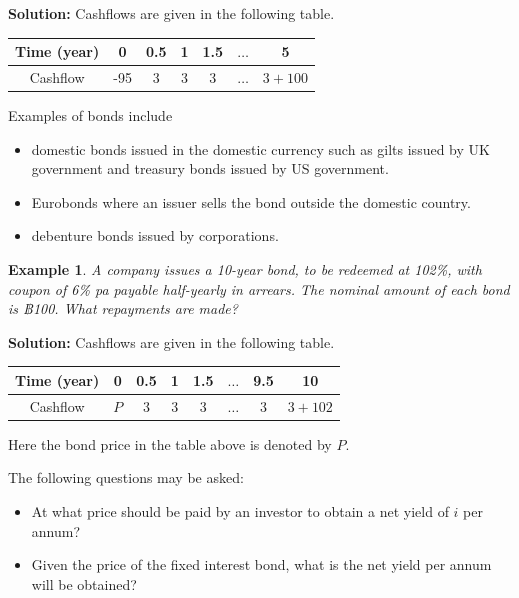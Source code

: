 \documentclass[
]{book}
\theoremstyle{definition}
\theoremstyle{definition}
\newtheorem{example}{Example}[chapter]
\theoremstyle{definition}
\theoremstyle{definition}
\theoremstyle{remark}
\begin{document}
\textbf{Solution:} Cashflows are given in the following table.

\begin{longtable}[]{@{}ccccccc@{}}
\toprule()
Time (year) & 0 & 0.5 & 1 & 1.5 & \(\ldots\) & 5 \\
\midrule()
\endhead
Cashflow & -95 & 3 & 3 & 3 & \(\ldots\) & \(3 + 100\) \\
\bottomrule()
\end{longtable}

Examples of bonds include

\begin{itemize}
\item
  domestic bonds issued in the domestic currency such as gilts issued
  by UK government and treasury bonds issued by US government.
\item
  Eurobonds where an issuer sells the bond outside the domestic
  country.
\item
  debenture bonds issued by corporations.
\end{itemize}

\begin{example}
\protect\hypertarget{exm:exampleBondPrice}{}\label{exm:exampleBondPrice}\emph{A company issues a 10-year bond, to be redeemed at 102\%, with coupon of
6\% pa payable half-yearly in arrears. The nominal amount of each bond is
฿100. What repayments are made?}
\end{example}

\textbf{Solution:} Cashflows are given in the following table.

\begin{longtable}[]{@{}cccccccc@{}}
\toprule()
Time (year) & 0 & 0.5 & 1 & 1.5 & \(\ldots\) & 9.5 & 10 \\
\midrule()
\endhead
Cashflow & \(P\) & 3 & 3 & 3 & \(\ldots\) & \(3\) & \(3 + 102\) \\
\bottomrule()
\end{longtable}

Here the bond price in the table above is denoted by \(P\).

The following questions may be asked:

\begin{itemize}
\item
  At what price should be paid by an investor to obtain a net yield of
  \(i\) per annum?
\item
  Given the price of the fixed interest bond, what is the net yield
  per annum will be obtained?
\end{itemize}
\end{document}
